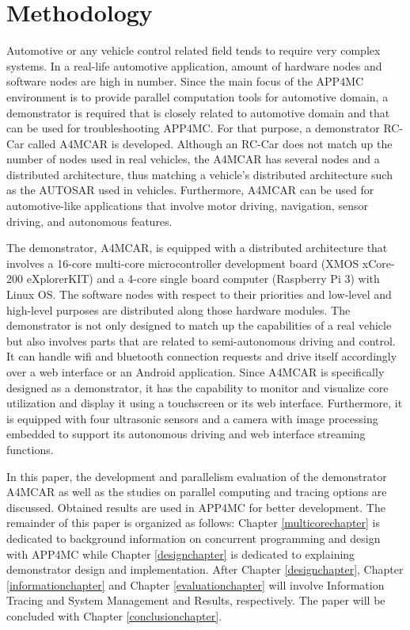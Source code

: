 \section{Methodology}

Automotive or any vehicle control related field tends to require very complex systems. In a real-life automotive application, amount of hardware nodes and software nodes are high in number. Since the main focus of the APP4MC environment is to provide parallel computation tools for automotive domain, a demonstrator is required that is closely related to automotive domain and that can be used for troubleshooting APP4MC. For that purpose, a demonstrator RC-Car called A4MCAR is developed. Although an RC-Car does not match up the number of nodes used in real vehicles, the A4MCAR has several nodes and a distributed architecture, thus matching a vehicle's distributed architecture such as the AUTOSAR used in vehicles. Furthermore, A4MCAR can be used for automotive-like applications that involve motor driving, navigation, sensor driving, and autonomous features.

The demonstrator, A4MCAR, is equipped with a distributed architecture that involves a 16-core multi-core microcontroller development board (XMOS xCore-200 eXplorerKIT) and a 4-core single board computer (Raspberry Pi 3) with Linux OS. The software nodes with respect to their priorities and low-level and high-level purposes are distributed along those hardware modules. The demonstrator is not only designed to match up the capabilities of a real vehicle but also involves parts that are related to semi-autonomous driving and control. It can handle wifi and bluetooth connection requests and drive itself accordingly over a web interface or an Android application. Since A4MCAR is specifically designed as a demonstrator, it has the capability to monitor and visualize core utilization and display it using a touchscreen or its web interface. Furthermore, it is equipped with four ultrasonic sensors and a camera with image processing embedded to support its autonomous driving and web interface streaming functions.

In this paper, the development and parallelism evaluation of the demonstrator A4MCAR as well as the studies on parallel computing and tracing options are discussed. Obtained results are used in APP4MC for better development. The remainder of this paper is organized as follows: Chapter \ref{multicorechapter} is dedicated to background information on concurrent programming and design with APP4MC while Chapter \ref{designchapter} is dedicated to explaining demonstrator design and implementation. After Chapter \ref{designchapter}, Chapter \ref{informationchapter} and Chapter \ref{evaluationchapter} will involve Information Tracing and System Management and Results, respectively. The paper will be concluded with Chapter \ref{conclusionchapter}.

